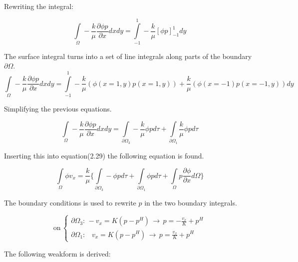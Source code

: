 \documentclass[a4paper]{report}
\begin{document}
Rewriting the integral:

\begin{equation}
 \int\limits_{\Omega}-\frac{k}{\mu}\frac{\partial \phi p}{\partial x}dxdy=\int\limits_{-1}^{1}-\frac{k}{\mu}[\phi p]^{1}_{-1}dy
\end{equation}

The surface integral turns into a set of line integrals along parts of the boundary $\partial\Omega$.
\begin{equation}
\int\limits_{\Omega}-\frac{k}{\mu}\frac{\partial \phi p}{\partial x}dxdy=  \int\limits_{-1}^{1}-\frac{k}{\mu}(\phi(x=1,y)p(x=1,y))+\frac{k}{\mu}(\phi(x=-1)p(x=-1,y))dy
\end{equation}

Simplifying the previous equations.

\begin{equation}
\int\limits_{\Omega}-\frac{k}{\mu}\frac{\partial \phi p}{\partial x}dxdy =\int\limits_{\partial\Omega_3}-\frac{k}{\mu}\phi pd\tau+\int\limits_{\partial\Omega_1}\frac{k}{\mu}\phi pd\tau
\end{equation}

Inserting this into equation(2.29) the following equation is found.

\begin{equation}
	\int\limits_{\Omega}\phi v_x = \frac{k}{\mu}\{\int\limits_{\partial\Omega_3}-\phi pd\tau+\int\limits_{\partial\Omega_1}\phi pd\tau+\int\limits_{\Omega}p\frac{\partial \phi}{\partial x}d\Omega\}
\end{equation}

The boundary conditions is used to rewrite $p$ in the two boundary integrals.



\begin{equation}
\text{on}\,
\begin{cases}
\partial\Omega_3:\, -v_x=K(p-p^H) \,\rightarrow\, p=-\frac{v_x}{K}+p^H\\
\partial\Omega_1:\,\,\,\,\, v_x=K(p-p^H) \,\rightarrow\, p=\frac{v_x}{K}+p^H
\end{cases}
\end{equation}

The following weakform is derived:

\end{document}
